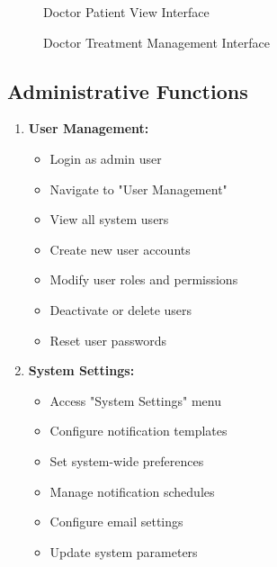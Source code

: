 \documentclass[12pt,a4paper]{article}
\begin{document}
\begin{figure}[H]
\centering
{}
\caption{Doctor Patient View Interface}
\end{figure}

\begin{figure}[H]
\centering
{}
\caption{Doctor Treatment Management Interface}
\end{figure}

\subsection{Administrative Functions}

\begin{enumerate}
    \item \textbf{User Management:}
    \begin{itemize}
        \item Login as admin user
        \item Navigate to "User Management"
        \item View all system users
        \item Create new user accounts
        \item Modify user roles and permissions
        \item Deactivate or delete users
        \item Reset user passwords
    \end{itemize}
    
    \item \textbf{System Settings:}
    \begin{itemize}
        \item Access "System Settings" menu
        \item Configure notification templates
        \item Set system-wide preferences
        \item Manage notification schedules
        \item Configure email settings
        \item Update system parameters
    \end{itemize}
\end{enumerate}
\end{document}
